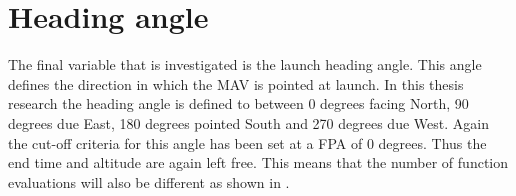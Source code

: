 %
%

\section{Heading angle}
\label{sec:headingAngle}
The final variable that is investigated is the launch heading angle. This angle defines the direction in which the \ac{MAV} is pointed at launch. In this thesis research the heading angle is defined to between 0 degrees facing North, 90 degrees due East, 180 degrees pointed South and 270 degrees due West. Again the cut-off criteria for this angle has been set at a \ac{FPA} of 0 degrees. Thus the end time and altitude are again left free. This means that the number of function evaluations will also be different as shown in .


%






